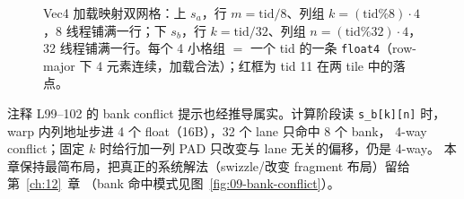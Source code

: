\begin{figure}[H]
\caption{Vec4 加载映射双网格：上 $s_a$，行 $m=\mathrm{tid}/8$、列组 $k=(\mathrm{tid}\%8)\cdot4$，8 线程铺满一行；下 $s_b$，行 $k=\mathrm{tid}/32$、列组 $n=(\mathrm{tid}\%32)\cdot4$，32 线程铺满一行。每个 4 小格组 $=$ 一个 tid 的一条 \texttt{float4}（row-major 下 4 元素连续，加载合法）；红框为 tid 11 在两 tile 中的落点。}
\label{fig:09-vec4-map}
\end{figure}

注释 L99--102 的 bank conflict 提示也经推导属实。计算阶段读 \texttt{s\_b[k][n]}
时，warp 内列地址步进 4 个 float（16B），32 个 lane 只命中 8 个 bank，
4-way conflict；固定 $k$ 时给行加一列 PAD 只改变与 lane 无关的偏移，仍是 4-way。
本章保持最简布局，把真正的系统解法（swizzle/改变 fragment 布局）留给第~\ref{ch:12}~章
（bank 命中模式见图~\ref{fig:09-bank-conflict}）。

